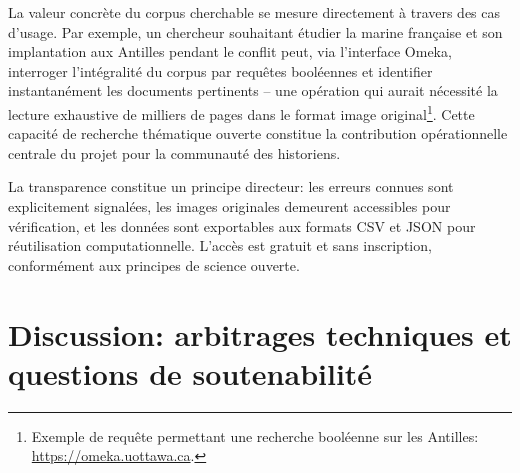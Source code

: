 \documentclass[final,fra]{anthology-ch}         %
\begin{document}
La valeur concrète du corpus cherchable se mesure directement à travers
des cas d'usage. Par exemple, un chercheur souhaitant étudier la marine française et
son implantation aux Antilles pendant le conflit peut, via l'interface
Omeka, interroger l'intégralité du corpus par requêtes
booléennes et identifier instantanément les documents pertinents -- une
opération qui aurait nécessité la lecture exhaustive de milliers de
pages dans le format image original\footnote{Exemple de requête
  permettant une recherche booléenne sur les Antilles:
  \href{https://omeka.uottawa.ca/examination-unit/search?query=guadel*+OR+caraib*+OR+antill*+OR+martiniq*+OR+\%22Fort-de-France\%22+OR+\%22Port-de-France\%22&query_type=boolean&record_types\%5B\%5D=Item&record_types\%5B\%5D=File&record_types\%5B\%5D=Collection&record_types\%5B\%5D=Exhibit&record_types\%5B\%5D=ExhibitPage&record_types\%5B\%5D=SimplePagesPage&submit_search=Submit}{\url{https://omeka.uottawa.ca}}.}.
Cette capacité de recherche thématique ouverte constitue la contribution
opérationnelle centrale du projet pour la communauté des historiens.

La transparence constitue un principe directeur: les erreurs connues
sont explicitement signalées, les images originales demeurent
accessibles pour vérification, et les données sont exportables aux
formats CSV et JSON pour réutilisation computationnelle. L'accès est
gratuit et sans inscription, conformément aux principes de science
ouverte.

\section{Discussion: arbitrages techniques et questions de
soutenabilité}\label{discussion-arbitrages-techniques-et-questions-de-soutenabilituxe9}
\end{document}
